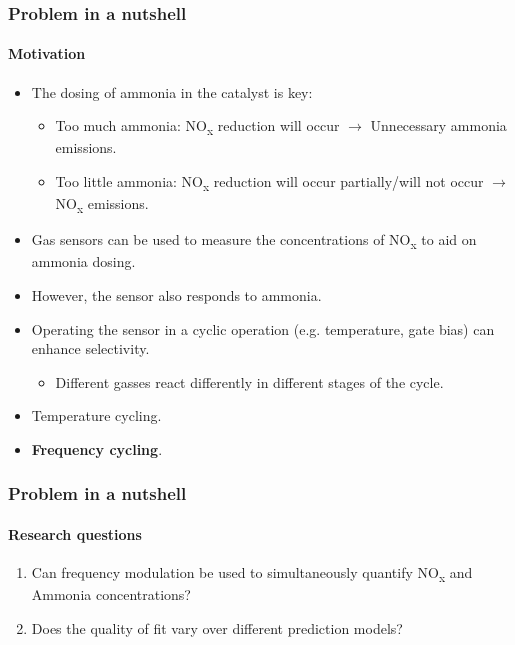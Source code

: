 \documentclass{beamer}
\newcommand{\nox}{\texorpdfstring{NO\textsubscript{x}}{NOx}\xspace}
\begin{document}
\begin{frame}
	\frametitle{Problem in a nutshell}
	\framesubtitle{Motivation}
	
	\begin{itemize}
		\pause
		\item The dosing of ammonia in the catalyst is key:
		
		\begin{itemize}
			\pause
			\item Too much ammonia: \nox  reduction will occur $\rightarrow$ Unnecessary ammonia emissions.
			\pause
			\item Too little ammonia: \nox  reduction will occur partially/will not occur $\rightarrow$ \nox  emissions.
			
		\end{itemize}
	\pause
		\item Gas sensors can be used to measure the concentrations of \nox  to aid on ammonia dosing.
		\pause
		\item However, the sensor also responds to ammonia.
		\pause
		\item Operating the sensor in a cyclic operation (e.g. temperature, gate bias) can enhance selectivity.
		
		\begin{itemize}
			\pause
			\item Different gasses react differently in different stages of the cycle.
			
		\end{itemize}
	\pause
		\item Temperature cycling.
		\pause
		\item \textbf{Frequency cycling}.
	\end{itemize}
	
\end{frame}


\begin{frame}
	\frametitle{Problem in a nutshell}
	\framesubtitle{Research questions}
	
	
\begin{enumerate}
	\pause
	\item Can frequency modulation be used to simultaneously quantify \nox and Ammonia concentrations?
	\pause
	\item Does the quality of fit vary over different prediction models?
\end{enumerate}
	
\end{frame}
\end{document}
